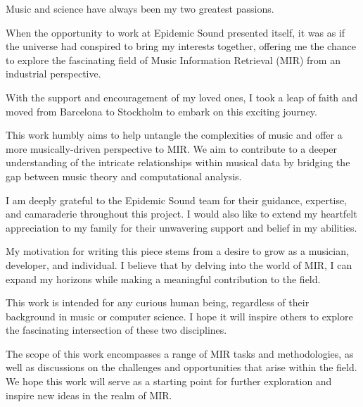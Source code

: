 \begin{preface}

Music and science have always been my two greatest passions. 

When the opportunity to work at Epidemic Sound presented itself, it was as if the universe had conspired to bring my interests together, offering me the chance to explore the fascinating field of Music Information Retrieval (MIR) from an industrial perspective. 

With the support and encouragement of my loved ones, I took a leap of faith and moved from Barcelona to Stockholm to embark on this exciting journey.

This work humbly aims to help untangle the complexities of music and offer a more musically-driven perspective to MIR. We aim to contribute to a deeper understanding of the intricate relationships within musical data by bridging the gap between music theory and computational analysis.

I am deeply grateful to the Epidemic Sound team for their guidance, expertise, and camaraderie throughout this project. I would also like to extend my heartfelt appreciation to my family for their unwavering support and belief in my abilities.

My motivation for writing this piece stems from a desire to grow as a musician, developer, and individual. I believe that by delving into the world of MIR, I can expand my horizons while making a meaningful contribution to the field.

This work is intended for any curious human being, regardless of their background in music or computer science. I hope it will inspire others to explore the fascinating intersection of these two disciplines.

The scope of this work encompasses a range of MIR tasks and methodologies, as well as discussions on the challenges and opportunities that arise within the field. We hope this work will serve as a starting point for further exploration and inspire new ideas in the realm of MIR.

\newpage
\end{preface}